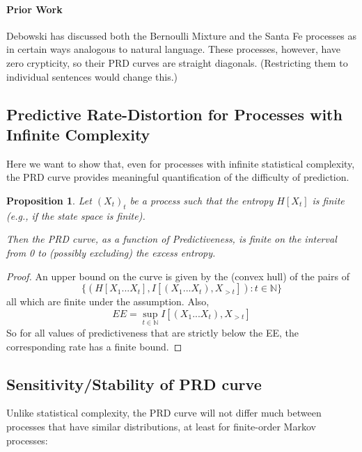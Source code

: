 \documentclass[11pt,letterpaper]{article}
\newcounter{theorem}
\newtheorem{proposition}[theorem]{Proposition}
\begin{document}
\paragraph{Prior Work}
Debowski has discussed both the Bernoulli Mixture and the Santa Fe processes as in certain ways  analogous to natural language.
These processes, however, have zero crypticity, so their PRD curves are straight diagonals. (Restricting them to individual sentences would change this.)






\subsection{Predictive Rate-Distortion for Processes with Infinite Complexity}
Here we want to show that, even for processes with infinite statistical complexity, the PRD curve provides meaningful quantification of the difficulty of prediction.

\begin{proposition}
Let $(X_t)_t$ be a process such that the entropy $H[X_t]$ is finite (e.g., if the state space is finite).

Then the PRD curve, as a function of Predictiveness, is finite on the interval from 0 to (possibly excluding) the excess entropy.
\end{proposition}

\begin{proof}
An upper bound on the curve is given by the (convex hull) of the pairs of $$\{(H[X_1...X_t], I[(X_1...X_t), X_{>t}]) : t \in \mathbb{N}\}$$
all which are finite under the assumption. 
Also, $$EE = \sup_{t \in \mathbb{N}} I[(X_1...X_t), X_{>t}]$$
So for all values of predictiveness that are strictly below the EE, the corresponding rate has a finite bound.
\end{proof}


\subsection{Sensitivity/Stability of PRD curve}
Unlike statistical complexity, the PRD curve will not differ much between processes that have similar distributions, at least for finite-order Markov processes:
\end{document}
